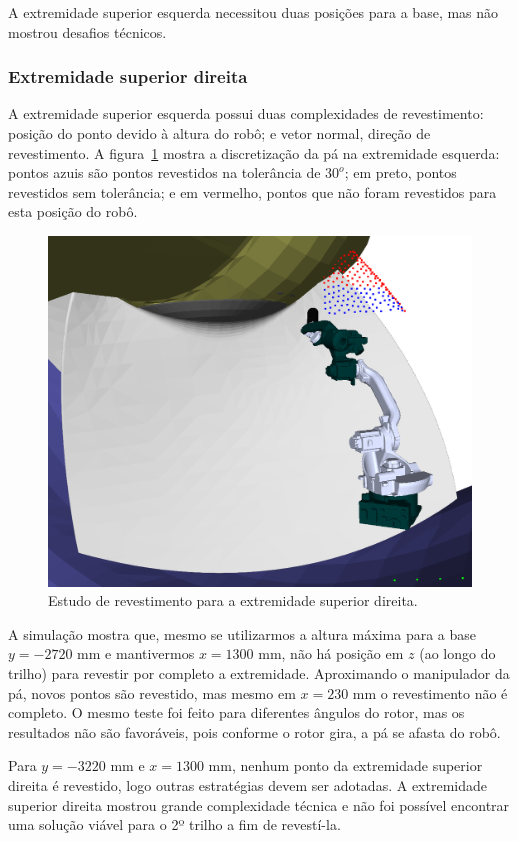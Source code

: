A extremidade superior esquerda necessitou duas posições para a base, mas não
mostrou desafios técnicos.

\subsubsection{Extremidade superior direita}

A extremidade superior esquerda possui duas complexidades de revestimento:
posição do ponto devido à altura do robô; e vetor normal, direção de
revestimento. A figura~\ref{fig::shoulderright} mostra a discretização da pá na
extremidade esquerda: pontos azuis são pontos revestidos na tolerância de $30^o$; em preto, pontos revestidos sem tolerância; e em vermelho, pontos que
não foram revestidos para esta posição do robô.

\begin{figure}[!ht]
	\centering	
	\includegraphics[width=1\columnwidth]{figs/shoulderright.png}
	\caption{Estudo de revestimento para a extremidade superior direita.}
	\label{fig::shoulderright}
\end{figure}

A simulação mostra que, mesmo se utilizarmos a altura máxima para a base
$y=-2720$ mm e mantivermos $x=1300$ mm, não há posição em $z$ (ao longo do
trilho) para revestir por completo a extremidade. Aproximando o manipulador da
pá, novos pontos são revestido, mas mesmo em $x=230$ mm o
revestimento não é completo. O mesmo teste foi feito para diferentes
ângulos do rotor, mas os resultados não são favoráveis, pois conforme o rotor
gira, a pá se afasta do robô.

Para $y=-3220$ mm e $x=1300$ mm, nenhum ponto da extremidade superior direita é
revestido, logo outras estratégias devem ser adotadas. A extremidade superior
direita mostrou grande complexidade técnica e não foi possível encontrar uma
solução viável para o 2º trilho a fim de revestí-la.
